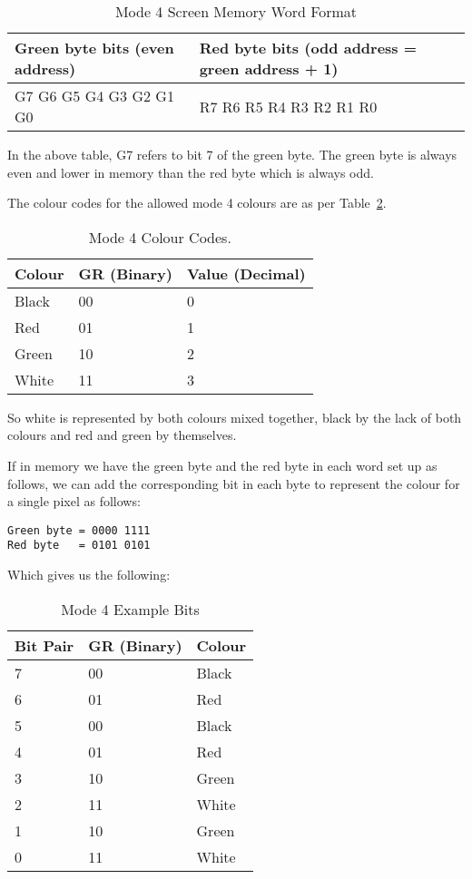 \begin{table}[htbp]
\centering
\begin{tabular}{l l}
\toprule
\textbf{Green byte bits (even address)} & \textbf{Red byte bits (odd address = green address + 1)}  \\
\midrule
%
G7 G6 G5 G4 G3 G2 G1 G0 & R7 R6 R5 R4 R3 R2 R1 R0 \\
%
\bottomrule
\end{tabular}
\caption{Mode 4 Screen Memory Word Format}
\label{tab:Mode4ScreeMemoryWordFormat}
\end{table}



In the above table, G7 refers to bit 7 of the green byte. The green
    byte is always even and lower in memory than the red byte which is always
    odd.

The colour codes for the allowed mode 4 colours are as per Table~\ref{tab:Mode4ColourCodes}.
\begin{table}[htbp]
\centering
\begin{tabular}{l l l}
\toprule
\textbf{Colour} & \textbf{GR (Binary)} & \textbf{Value (Decimal)}  \\
\midrule
%
Black & 00 & 0 \\
Red   & 01 & 1 \\
Green & 10 & 2 \\
White & 11 & 3 \\
%
\bottomrule
\end{tabular}
\caption{Mode 4 Colour Codes.}
\label{tab:Mode4ColourCodes}
\end{table}

So white is represented by both colours mixed together, black by the
    lack of both colours and red and green by themselves.

If in memory we have the green byte and the red byte in each word
    set up as follows, we can add the corresponding bit in each byte to
    represent the colour for a single pixel as follows:


\begin{lstlisting}[frame=none,numbers=none]
Green byte = 0000 1111 
Red byte   = 0101 0101
\end{lstlisting}

Which gives us the following:


\begin{table}[htbp]
\centering
\begin{tabular}{l l l}
\toprule
\textbf{Bit Pair} & \textbf{GR (Binary)} & \textbf{Colour}  \\
\midrule
%
7 & 00 & Black \\
6 & 01 & Red \\
5 & 00 & Black \\
4 & 01 & Red \\
3 & 10 & Green \\
2 & 11 & White \\
1 & 10 & Green \\
0 & 11 & White \\
%
\bottomrule
\end{tabular}
\caption{Mode 4 Example Bits}
\label{tab:Mode4ExampleBits}
\end{table}


